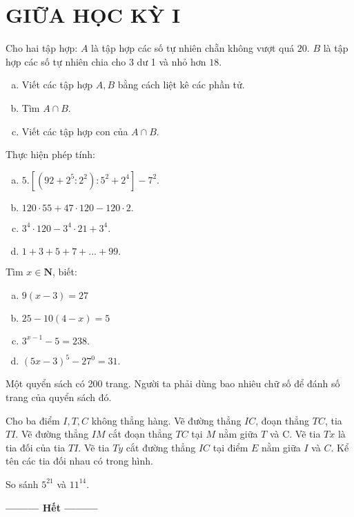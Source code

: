 \section{GIỮA HỌC KỲ I}
\setcounter{ex}{0}
\begin{ex}  Cho hai tập hợp: $A$ là tập hợp các số tự nhiên chẵn không vượt quá $20$.
$B$ là tập hợp các số tự nhiên chia cho $3$ dư 1 và nhỏ hơn $18$.
	\begin{enumerate}[a)]
		\item Viết các tập hợp $A, B$ bằng cách liệt kê các phần tử.
		\item Tìm $A \cap B$.
		\item Viết các tập hợp con của $A \cap B$.
	\end{enumerate}
\end{ex}    \begin{ex}  Thực hiện phép tính:
\begin{enumerate}[a)]
\item $5.[(92 + 2^5:2^2):5^2 + 2^4]-7^2.$
\item $120 \cdot 55 + 47 \cdot 120 - 120 \cdot 2.$
\item ${3^4} \cdot 120 - {3^4} \cdot 21 + {3^4}$.
\item $1 + 3 + 5 + 7 + ... + 99.$
\end{enumerate}
\end{ex}    \begin{ex}  Tìm $x \in  \mathbf{N}$, biết:
\begin{enumerate}[a)]
\item $9(x - 3) = 27$
\item $25 - 10(4 - x) = 5$
\item ${3^{x - 1}} - 5 = 238.$
\item ${(5x - 3)^5} - {27^0} = 31.$
\end{enumerate}     
\end{ex}    \begin{ex} 	Một quyển sách có 200 trang. Người ta phải dùng bao nhiêu chữ số để đánh số trang của quyển sách đó.\\
\end{ex}    \begin{ex} 	Cho ba điểm $I, T, C$ không thẳng hàng. Vẽ đường thẳng $IC$, đoạn thẳng $TC$, tia $TI$. Vẽ đường thẳng $IM$ cắt đoạn thẳng $TC$ tại $M$ nằm giữa $T$ và C. Vẽ tia $Tx$ là tia đối của tia $TI$. Vẽ tia $Ty$ cắt đường thẳng $IC$ tại điểm $E$ nằm giữa $I$ và $C$.
Kể tên các tia đối nhau có trong hình. \\
\end{ex}    \begin{ex}  So sánh $5^{21}$ và $11^{14}$.
\end{ex}
\begin{center}
\textbf{\textbf{---------} Hết \textbf{---------}}
\end{center}
